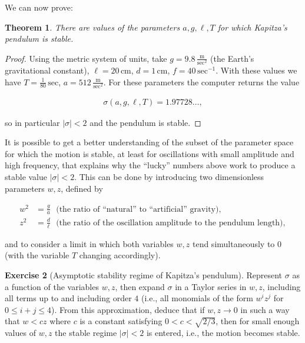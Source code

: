\documentclass[11pt]{report}
\theoremstyle{plain}
\newtheorem{thm}{Theorem}[chapter]
\theoremstyle{definition}
\newtheorem{xexercise}[thm]{Exercise}
\begin{document}
\noindent We can now prove:

\begin{thm}
There are values of the parameters $a, g, \ell, T$ for
which Kapitza's pendulum is stable.
\end{thm}

\begin{proof}
Using the metric system of units, take
$g=9.8\,\frac{\textrm{m}}{\textrm{sec}^2}$ (the
Earth's gravitational constant),
$\ell = 20\, \textrm{cm}$, $d=1\,\textrm{cm}$,
$f=40\,\textrm{sec}^{-1}$. With these values we have
$T=\frac{1}{80}\,\textrm{sec}$,
$a=512\,\frac{\textrm{m}}{\textrm{sec}^2}$. For these
parameters the computer returns the value

\begin{align*}
\sigma(a, g, \ell, T) = 1.97728\ldots,
\end{align*}

\noindent so in particular $|\sigma|<2$ and the pendulum is
stable.
\end{proof}

\noindent It is possible to get a better understanding of the
subset of the parameter space for which the motion is
stable, at least for oscillations with small amplitude
and high frequency, that explains why the ``lucky''
numbers above work to produce a stable value
$|\sigma|<2$. This can be done by introducing two
dimensionless parameters $w,z$, defined by

\begin{align*}
w^2 &= \frac{g}{a}\ \ \  \textrm{(the ratio of ``natural'' to ``artificial'' gravity)}, \\
z^2 &= \frac{d}{\ell}\ \ \  \textrm{(the ratio of the oscillation amplitude to the pendulum length)},
\end{align*}

\noindent and to consider a limit in which both variables $w,z$
tend simultaneously to $0$ (with the variable $T$
changing accordingly).

\begin{xexercise}[Asymptotic stability regime of Kapitza's pendulum]
Represent $\sigma$ as a function of the variables
$w, z$, then expand $\sigma$ in a Taylor series in
$w,z$, including all terms up to and including order
$4$ (i.e., all monomials of the form $w^i z^j$ for
$0\le i+j\le 4$). From this approximation, deduce that
if $w,z\to 0$ in such a way that $w<cz$ where $c$ is a
constant satisfying $0<c<\sqrt{2/3}$, then for small
enough values of $w,z$ the stable regime $|\sigma|<2$
is entered, i.e., the motion becomes stable.
\end{xexercise}
\end{document}
